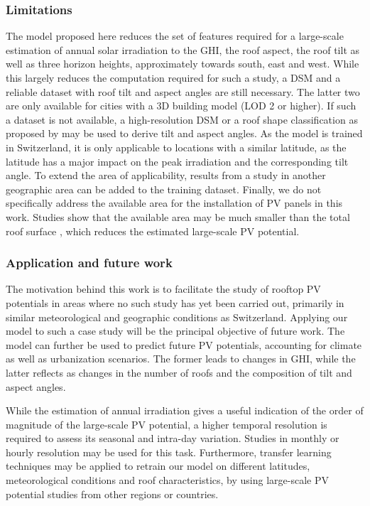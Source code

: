 \subsubsection{Limitations}
The model proposed here reduces the set of features required for a large-scale estimation of annual solar irradiation to the GHI, the roof aspect, the roof tilt as well as three horizon heights, approximately towards south, east and west. While this largely reduces the computation required for such a study, a DSM and a reliable dataset with roof tilt and aspect angles are still necessary. The latter two are only available for cities with a 3D building model (LOD 2 or higher). If such a dataset is not available, a high-resolution DSM or a roof shape classification as proposed by \cite{mohajeri_city-scale_2018} may be used to derive tilt and aspect angles. As the model is trained in Switzerland, it is only applicable to locations with a similar latitude, as the latitude has a major impact on the peak irradiation and the corresponding tilt angle. To extend the area of applicability, results from a study in another geographic area can be added to the training dataset. Finally, we do not specifically address the available area for the installation of PV panels in this work. Studies show that the available area may be much smaller than the total roof surface \cite{assouline_quantifying_2017}, which reduces the estimated large-scale PV potential.

\subsubsection{Application and future work}

The motivation behind this work is to facilitate the study of rooftop PV potentials in areas where no such study has yet been carried out, primarily in similar meteorological and geographic conditions as Switzerland. Applying our model to such a case study will be the principal objective of future work. The model can further be used to predict future PV potentials, accounting for climate as well as urbanization scenarios. The former leads to changes in GHI, while the latter reflects as changes in the number of roofs and the composition of tilt and aspect angles. 

While the estimation of annual irradiation gives a useful indication of the order of magnitude of the large-scale PV potential, a higher temporal resolution is required to assess its seasonal and intra-day variation. Studies in monthly \cite{assouline_large-scale_2018} or hourly \cite{buffat_scalable_2018} resolution may be used for this task. Furthermore, transfer learning techniques may be applied to retrain our model on different latitudes, meteorological conditions and roof characteristics, by using large-scale PV potential studies from other regions or countries.


